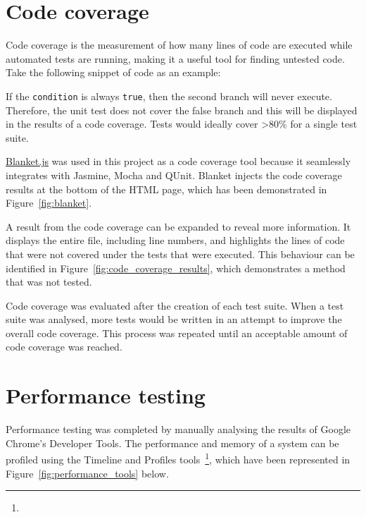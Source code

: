 % 	


\section{Code coverage} {
\label{sec:code_coverage}

	Code coverage is the measurement of how many lines of code are executed while automated tests are running, making it a useful tool for finding untested code. Take the following snippet of code as an example:

	

	If the \texttt{condition} is always \texttt{true}, then the second branch will never execute. Therefore, the unit test does not cover the false branch and this will be displayed in the results of a code coverage. Tests would ideally cover \textgreater80\% for a single test suite.

	\href{http://blanketjs.org/}{Blanket.js} was used in this project as a code coverage tool because it seamlessly integrates with Jasmine, Mocha and QUnit. Blanket injects the code coverage results at the bottom of the HTML page, which has been demonstrated in Figure~\ref{fig:blanket}.

	

	A result from the code coverage can be expanded to reveal more information. It displays the entire file, including line numbers, and highlights the lines of code that were not covered under the tests that were executed. This behaviour can be identified in Figure~\ref{fig:code_coverage_results}, which demonstrates a method that was not tested.

	

	Code coverage was evaluated after the creation of each test suite. When a test suite was analysed, more tests would be written in an attempt to improve the overall code coverage. This process was repeated until an acceptable amount of code coverage was reached.

}

\section{Performance testing} {
\label{sec:performance_testing}

	Performance testing was completed by manually analysing the results of Google Chrome's Developer Tools. The performance and memory of a system can be profiled using the Timeline and Profiles tools~\footnote{}, which have been represented in Figure~\ref{fig:performance_tools} below.

	

}
